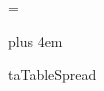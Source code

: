 \NormalTableUnits




\newcount\LineThicknessFactor
\newcount\StrutHeightFactor
\newcount\StrutDepthFactor
\newcount\InterColumnSpaceFactor
\newcount\ColumnWidthFactor
\newcount\KernFactor
\newcount\VspaceFactor




\newcount\TracingKeys %
\newcount\TracingFormats  %



\def\BeginTableParBox#1{%
  \vtop\bgroup
    \hsize=#1
    \normalbaselines
    \let~=\!ttTie
    \let\-=\!ttDH
    \the\EveryTableParBox}

\def\EndTableParBox{%
    \MakeStrut{0pt}{\StrutDepthFactor\StrutUnit}
  \egroup} %

\newtoks\EveryTableParBox
\EveryTableParBox={%
  \parindent=0pt
  \raggedright
  \rightskip=0pt plus 4em %
  \relax}



\newtoks\EveryTable
\newtoks\!taTableSpread



